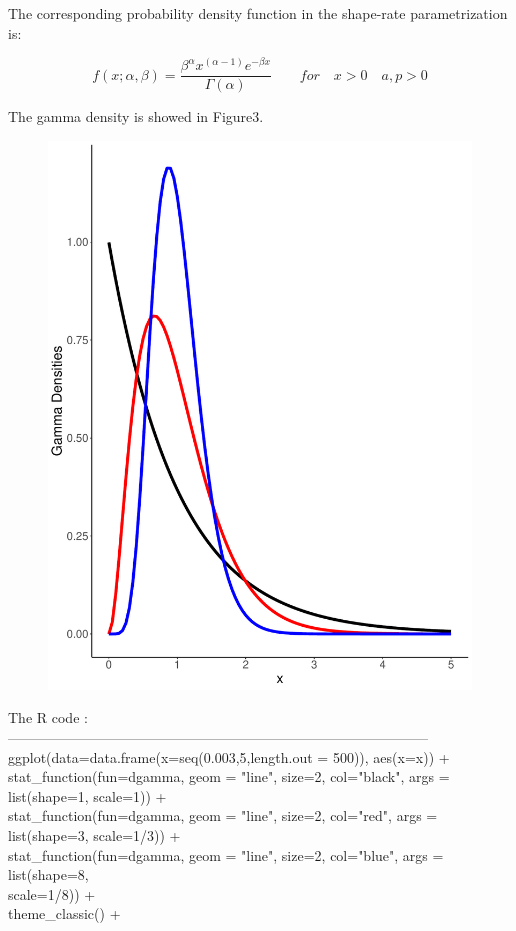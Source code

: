 \documentclass{book} %
\begin{document}
The corresponding probability density function in the shape-rate parametrization is:
\begin{center}
	\begin{equation}
f(x;\alpha,\beta)=
\frac{\beta^\alpha x^{(\alpha-1)}e^{-\beta x}}{\Gamma(\alpha)}   
\qquad for \quad x >0 \quad a,p>0
\end{equation} 
\end{center}
The gamma density is showed in Figure3.
\begin{figure}[H]
	\centering
	\includegraphics[width=0.7\linewidth,height=0.5\textheight]{gma_den}
	\caption{}
	\label{fig:gmaden}
\end{figure}
\noindent The R code :\\
------------------------------------------------------------------------------------------\\
ggplot(data=data.frame(x=seq(0.003,5,length.out = 500)), aes(x=x)) +\\
stat\_function(fun=dgamma, geom = "line", size=2, col="black", args = list(shape=1, scale=1)) +\\
stat\_function(fun=dgamma, geom = "line", size=2, col="red", args = list(shape=3, scale=1/3)) +\\
stat\_function(fun=dgamma, geom = "line", size=2, col="blue", args = list(shape=8,\\ scale=1/8)) +\\
theme\_classic() +\\
\end{document}
